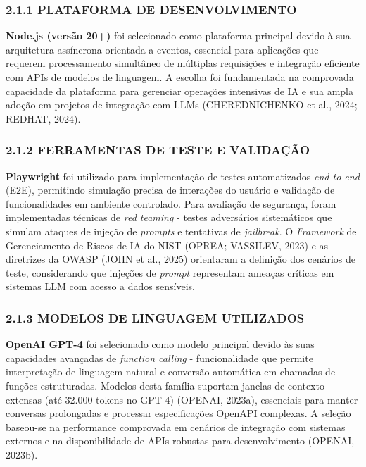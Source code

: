 \documentclass[
]{article}
\begin{document}
\subsubsection{2.1.1 PLATAFORMA DE
DESENVOLVIMENTO}\label{plataforma-de-desenvolvimento}

\textbf{Node.js (versão 20+)} foi selecionado como plataforma principal
devido à sua arquitetura assíncrona orientada a eventos, essencial para
aplicações que requerem processamento simultâneo de múltiplas
requisições e integração eficiente com APIs de modelos de linguagem. A
escolha foi fundamentada na comprovada capacidade da plataforma para
gerenciar operações intensivas de IA e sua ampla adoção em projetos de
integração com LLMs (CHEREDNICHENKO et al., 2024; REDHAT, 2024).

\subsubsection{2.1.2 FERRAMENTAS DE TESTE E
VALIDAÇÃO}\label{ferramentas-de-teste-e-validauxe7uxe3o}

\textbf{Playwright} foi utilizado para implementação de testes
automatizados \emph{end-to-end} (E2E), permitindo simulação precisa de
interações do usuário e validação de funcionalidades em ambiente
controlado. Para avaliação de segurança, foram implementadas técnicas de
\emph{red teaming} - testes adversários sistemáticos que simulam ataques
de injeção de \emph{prompts} e tentativas de \emph{jailbreak}. O
\emph{Framework} de Gerenciamento de Riscos de IA do NIST (OPREA;
VASSILEV, 2023) e as diretrizes da OWASP (JOHN et al., 2025) orientaram
a definição dos cenários de teste, considerando que injeções de
\emph{prompt} representam ameaças críticas em sistemas LLM com acesso a
dados sensíveis.

\subsubsection{2.1.3 MODELOS DE LINGUAGEM
UTILIZADOS}\label{modelos-de-linguagem-utilizados}

\textbf{OpenAI GPT-4} foi selecionado como modelo principal devido às
suas capacidades avançadas de \emph{function calling} - funcionalidade
que permite interpretação de linguagem natural e conversão automática em
chamadas de funções estruturadas. Modelos desta família suportam janelas
de contexto extensas (até 32.000 tokens no GPT-4) (OPENAI, 2023a),
essenciais para manter conversas prolongadas e processar especificações
OpenAPI complexas. A seleção baseou-se na performance comprovada em
cenários de integração com sistemas externos e na disponibilidade de
APIs robustas para desenvolvimento (OPENAI, 2023b).
\end{document}
